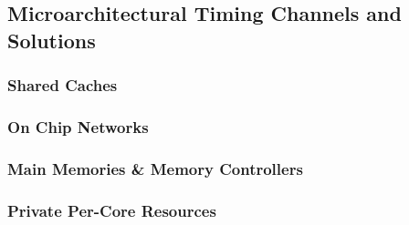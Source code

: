 \subsection{Microarchitectural Timing Channels and Solutions}
\subsubsection{Shared Caches}
\subsubsection{On Chip Networks}
\subsubsection{Main Memories \& Memory Controllers}
\subsubsection{Private Per-Core Resources}



